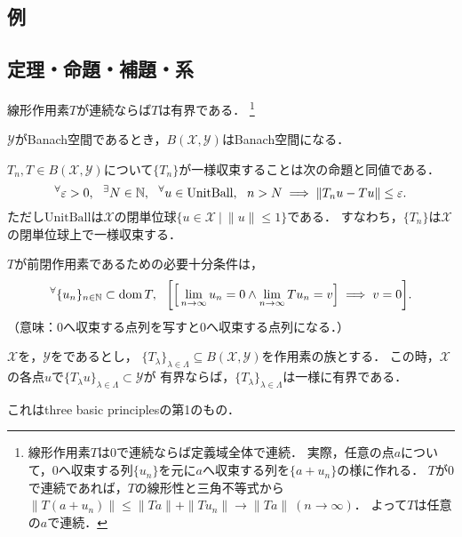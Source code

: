\documentclass[a4j]{jsarticle}
\newcommand{\spX}{\mathscr{X}}
\newcommand{\spY}{\mathscr{Y}}
\newcommand{\spB}[2]{B(\mathscr{#1}, \mathscr{#2})}
\begin{document}
    \subsection{例}

    \subsection{定理・命題・補題・系}
    \begin{Them}[定理7.1, p.148] \label{them7:1}
        線形作用素$T$が連続ならば$T$は有界である．
        \footnote{線形作用素$T$は0で連続ならば定義域全体で連続．
        実際，任意の点$a$について，0へ収束する列$\{u_n\}$を元に$a$へ収束する列を$\{a+u_n\}$の様に作れる．
        $T$が0で連続であれば，$T$の線形性と三角不等式から$\|T(a+u_n)\| \leq \|Ta\|+\|Tu_n\| \to \|Ta\|~(n \to \infty)$．
        よって$T$は任意の$a$で連続．}
    \end{Them}

    \begin{Them}[定理7.6, p.150] \label{them7:6}
        $\spY$がBanach空間であるとき，$\spB{X}{Y}$はBanach空間になる．
    \end{Them}

    \begin{Them}[定理7.8, p.153] \label{them7:8}
        $T_n, T \in \spB{X}{Y}$について$\{T_n\}$が一様収束することは次の命題と同値である．
        \[ {}^{\forall} \varepsilon>0,~~ {}^{\exists} N \in \mathbb{N},~~ {}^{\forall} u \in \mathrm{UnitBall},~~ n>N \implies \| T_n u-T u \| \leq \varepsilon. \]
        ただし$\mathrm{UnitBall}$は$\spX$の閉単位球$\{u \in \spX ~|~ \|u\| \leq 1\}$である．
        すなわち，$\{T_n\}$は$\spX$の閉単位球上で一様収束する．
    \end{Them}

    \begin{Them}[定理7.20 (i), p.166] \label{them7:20}
        $T$が前閉作用素であるための必要十分条件は，
        \[ {}^{\forall} \{ u_n \}_{n \in \mathbb{N}} \subset \operatorname{dom} T,~~ \bigg[\Big[\lim_{n \to \infty}u_n=0  \land \lim_{n \to \infty}Tu_n=v \Big] \implies v=0 \bigg]. \]
        （意味：0へ収束する点列を写すと0へ収束する点列になる．）
    \end{Them}

    \begin{Them}[定理7.21, p.166, 一様有界性の原理] \label{them7:21}
        $\spX$を，$\spY$をであるとし，
        $\{ T_{\lambda} \}_{\lambda \in \Lambda} \subseteq \spB{X}{Y}$を作用素の族とする．
        この時，$\spX$の各点$u$で$\{ T_{\lambda}u \}_{\lambda \in \Lambda} \subset \spY$が
        有界ならば，$\{ T_{\lambda} \}_{\lambda \in \Lambda}$は一様に有界である．
    \end{Them}
    これはthree basic principlesの第1のもの．
\end{document}
